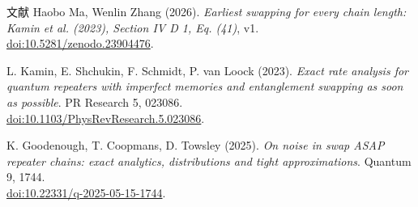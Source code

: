 \documentclass{beamer}
\begin{document}
\begin{frame}{文献}
\small
Haobo Ma, Wenlin Zhang (2026). \emph{Earliest swapping for every chain length: Kamin et al. (2023), Section IV D 1, Eq. (41)}, v1.\\
\href{https://doi.org/10.5281/zenodo.23904476}{doi:10.5281/zenodo.23904476}.
\medskip

L. Kamin, E. Shchukin, F. Schmidt, P. van Loock (2023). \emph{Exact rate analysis for quantum repeaters with imperfect memories and entanglement swapping as soon as possible}. PR Research 5, 023086.\\
\href{https://doi.org/10.1103/PhysRevResearch.5.023086}{doi:10.1103/PhysRevResearch.5.023086}.
\medskip

K. Goodenough, T. Coopmans, D. Towsley (2025). \emph{On noise in swap ASAP repeater chains: exact analytics, distributions and tight approximations}. Quantum 9, 1744.\\
\href{https://doi.org/10.22331/q-2025-05-15-1744}{doi:10.22331/q-2025-05-15-1744}.
\end{frame}
\appendix
\end{document}
